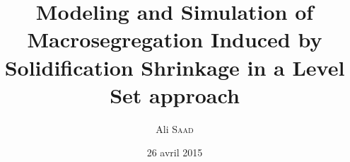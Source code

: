 \documentclass[a4paper, 12pt, twoside]{book}
\author{Ali \textsc{Saad}}
\title{Modeling and Simulation of Macrosegregation Induced by Solidification Shrinkage in a Level Set approach}
\date{26 avril 2015}
\begin{document}
\pagedegarde
\end{document}
